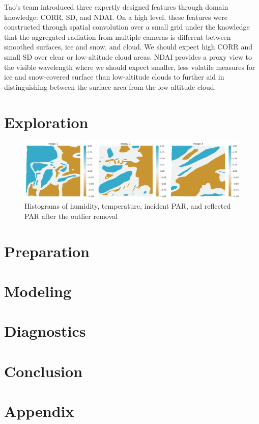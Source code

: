 \documentclass[11pt, letterpaper, journal]{IEEEtran}
\begin{document}
Tao's team introduced three expertly designed features through domain knowledge: CORR, SD, and NDAI. On a high level, these features were constructed through spatial convolution over a small grid under the knowledge that the aggregated radiation from multiple cameras is different between smoothed surfaces, ice and snow, and cloud. We should expect high CORR and small SD over clear or low-altitude cloud areas. NDAI provides a proxy view to the visible wavelength where we should expect smaller, less volatile measures for ice and snow-covered surface than low-altitude clouds to further aid in distinguishing between the surface area from the low-altitude cloud. 

\section{Exploration}
\begin{figure}[h!]
\centering
\captionsetup{justification=centering}
\includegraphics[width=1.0\textwidth]{1.a.png}
\caption{Histograms of humidity, temperature, incident PAR, and reflected PAR after the outlier removal}
\label{fig3:combined_hist_after_clean}
\end{figure}
\lipsum[2-4]

\section{Preparation}
\lipsum[2-4]

\section{Modeling}
\lipsum[2-4]

\section{Diagnostics}
\lipsum[2-4]

\section{Conclusion}
\lipsum[2-4]

\section{Appendix}
\lipsum[2-4]
\end{document}
